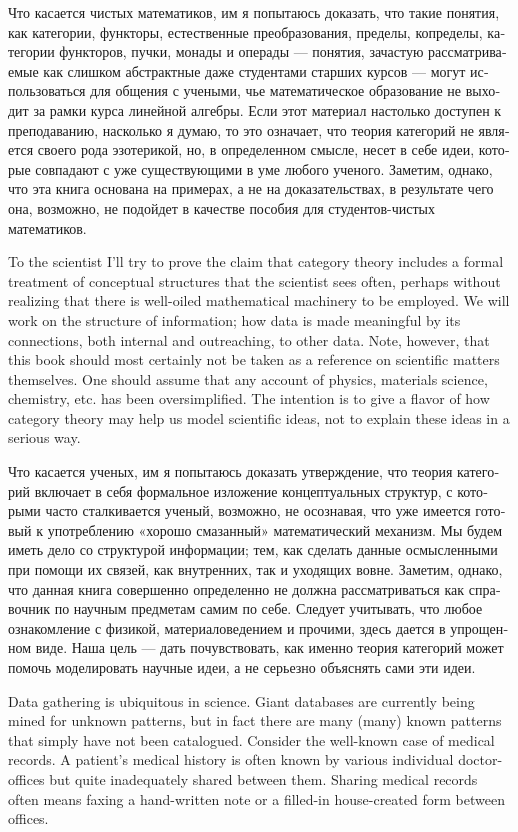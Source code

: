 \documentclass[a4paper]{book}
\theoremstyle{myth}
\begin{document}
\begin{russian}
Что касается чистых математиков, им я попытаюсь доказать, что такие понятия, как категории, функторы, естественные преобразования, пределы, копределы, категории функторов, пучки, монады и операды — понятия, зачастую рассматриваемые как слишком абстрактные даже студентами старших курсов — могут использоваться для общения с учеными, чье математическое образование не выходит за рамки курса линейной алгебры. Если этот материал настолько доступен к преподаванию, насколько я думаю, то это означает, что теория категорий не является своего рода эзотерикой, но, в определенном смысле, несет в себе идеи, которые совпадают с уже существующими в уме любого ученого. Заметим, однако, что эта книга основана на примерах, а не на доказательствах, в результате чего она, возможно, не подойдет в качестве пособия для студентов-чистых математиков. 

To the scientist I'll try to prove the claim that category theory includes a formal treatment of conceptual structures that the scientist sees often, perhaps without realizing that there is well-oiled mathematical machinery to be employed. We will work on the structure of information; how data is made meaningful by its connections, both internal and outreaching, to other data. Note, however, that this book should most certainly not be taken as a reference on scientific matters themselves. One should assume that any account of physics, materials science, chemistry, etc. has been oversimplified. The intention is to give a flavor of how category theory may help us model scientific ideas, not to explain these ideas in a serious way.

Что касается ученых, им я попытаюсь доказать утверждение, что теория категорий включает в себя формальное изложение концептуальных структур, с которыми часто сталкивается ученый, возможно, не осознавая, что уже имеется готовый к употреблению «хорошо смазанный» математический механизм. Мы будем иметь дело со структурой информации; тем, как сделать данные осмысленными при помощи их связей, как внутренних, так и уходящих вовне. Заметим, однако, что данная книга совершенно определенно не должна рассматриваться как справочник по научным предметам самим по себе. Следует учитывать, что любое ознакомление с физикой, материаловедением и прочими, здесь дается в упрощенном виде. Наша цель — дать почувствовать, как именно теория категорий может помочь моделировать научные идеи, а не серьезно объяснять сами эти идеи. 

Data gathering is ubiquitous in science. Giant databases are currently being mined for unknown patterns, but in fact there are many (many) known patterns that simply have not been catalogued. Consider the well-known case of medical records. A patient's medical history is often known by various individual doctor-offices but quite inadequately shared between them. Sharing medical records often means faxing a hand-written note or a filled-in house-created form between offices.


\end{russian}
\end{document}
